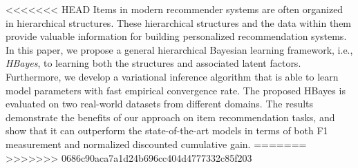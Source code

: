 <<<<<<< HEAD
Items in modern recommender systems are often organized in hierarchical structures. These hierarchical structures and the data within them provide valuable information for building personalized recommendation systems. In this paper, we propose a general hierarchical Bayesian learning framework, i.e., \emph{HBayes}, to learning both the structures and associated latent factors. Furthermore, we develop a variational inference algorithm that is able to learn model parameters with fast empirical convergence rate. The proposed HBayes is evaluated on two real-world datasets from different domains. The results demonstrate the benefits of our approach on item recommendation tasks, and show that it can outperform the state-of-the-art models in terms of both F1 measurement and normalized discounted cumulative gain.
=======
>>>>>>> 0686c90aca7a1d24b696cc404d4777332c85f203
